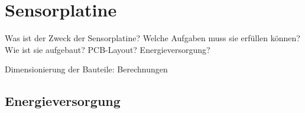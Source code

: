 
\clearpage
\section{Sensorplatine}
\label{sec:hw:sensorplatine}

Was  ist der  Zweck  der Sensorplatine? Welche  Aufgaben  muss sie  erf\"ullen
k\"onnen? Wie ist sie aufgebaut? PCB-Layout? Energieversorgung?

\anweisung Dimensionierung der Bauteile: Berechnungen


\subsection{Energieversorgung}
\label{subsec:sensor:pcb}

